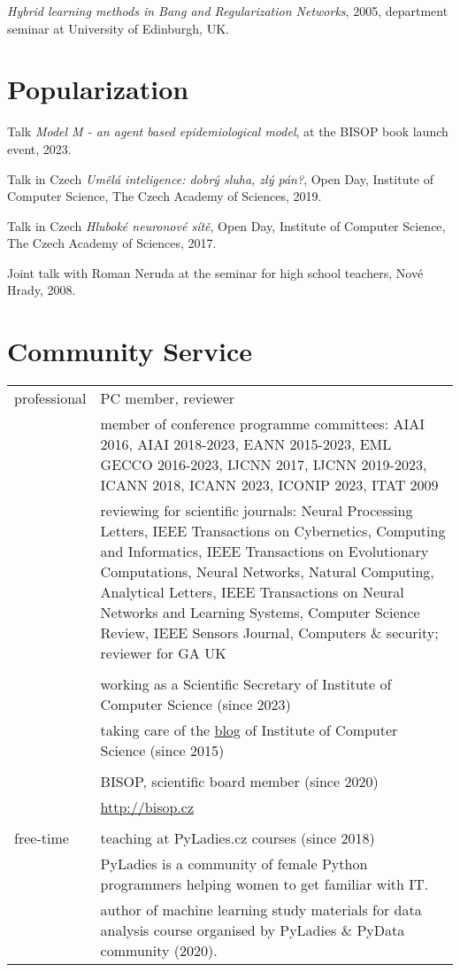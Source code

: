 \documentclass[a4paper, oneside, final]{scrartcl} %
\newcommand{\gray}{\rowcolor[gray]{.90}} %
\begin{document}
\noindent
{\em Hybrid learning methods in Bang and Regularization Networks},
 2005, department seminar at University of Edinburgh, UK.

\section{Popularization}
Talk {\em Model M - an agent based epidemiological model}, at the
BISOP book launch event, 2023.

\noindent
Talk in Czech {\em Umělá inteligence: dobrý sluha, zlý pán?}, Open
Day, Institute of Computer Science, The Czech Academy of Sciences,
2019.

\noindent
Talk in Czech {\em Hluboké neuronové sítě}, Open
Day, Institute of Computer Science, The Czech Academy of Sciences,
2017.

\noindent
Joint talk with Roman Neruda at the seminar for high school teachers,
Nové Hrady, 2008.

\section{Community Service}

\begin{tabularx}{0.97\linewidth}{>{\raggedleft}p{2cm}X}
\gray  professional & PC member, reviewer \\
    & member of conference programme committees:
 AIAI 2016, AIAI 2018-2023, EANN 2015-2023, EML GECCO 2016-2023, IJCNN 2017, IJCNN 2019-2023,
ICANN 2018, ICANN 2023, ICONIP 2023, ITAT 2009 \\
    & reviewing for scientific journals: Neural Processing Letters,
    IEEE Transactions on Cybernetics, Computing and Informatics, IEEE
    Transactions on Evolutionary Computations, Neural Networks, Natural
    Computing, Analytical Letters, IEEE Transactions on Neural Networks
    and Learning Systems, Computer Science Review, IEEE Sensors Journal,
    Computers \& security; reviewer for GA UK \\
  &  \\
    \gray & working as a Scientific Secretary of  Institute of Computer Science (since 2023)\\
    & taking care of the \href{http://zatisi.cs.cas.cz}{blog} of Institute of Computer Science (since 2015) \\

    &  \\

    \gray & BISOP, scientific board member (since 2020) \\
     & \href{http://bisop.cz}{http://bisop.cz} \\
  &   \\
\gray free-time & teaching at PyLadies.cz courses (since 2018) \\
& PyLadies is a community of female Python programmers helping women to get
familiar with IT. \\
\gray & author of machine learning study materials for   
data analysis course organised by PyLadies \&  PyData community (2020).
\end{tabularx}
\end{document}
